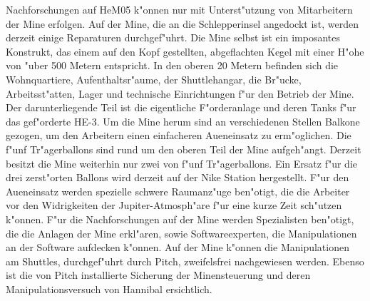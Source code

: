 Nachforschungen auf HeM05 k"onnen nur mit Unterst"utzung von Mitarbeitern der Mine erfolgen. Auf der Mine, die an die Schlepperinsel angedockt ist, werden derzeit einige Reparaturen durchgef"uhrt. Die Mine selbst ist ein imposantes Konstrukt, das einem auf den Kopf gestellten, abgeflachten Kegel mit einer H"ohe von "uber 500 Metern entspricht. In den oberen 20 Metern befinden sich die Wohnquartiere, Aufenthaltsr"aume, der Shuttlehangar, die Br"ucke, Arbeitsst"atten, Lager und technische Einrichtungen f"ur den Betrieb der Mine. Der darunterliegende Teil ist die eigentliche F"orderanlage und deren Tanks f"ur das gef"orderte HE-3. Um die Mine herum sind an verschiedenen Stellen Balkone gezogen, um den Arbeitern einen einfacheren Au\3eneinsatz zu erm"oglichen. Die f"unf Tr"agerballons sind rund um den oberen Teil der Mine aufgeh"angt. Derzeit besitzt die Mine weiterhin nur zwei von f"unf Tr"agerballons. Ein Ersatz f"ur die drei zerst"orten Ballons wird derzeit auf der Nike Station hergestellt. F"ur den Au\3eneinsatz werden spezielle schwere Raumanz"uge ben"otigt, die die Arbeiter vor den Widrigkeiten der Jupiter-Atmosph"are f"ur eine kurze Zeit sch"utzen k"onnen. F"ur die Nachforschungen auf der Mine werden Spezialisten ben"otigt, die die Anlagen der Mine erkl"aren, sowie Softwareexperten, die Manipulationen an der Software aufdecken k"onnen. Auf der Mine k"onnen die Manipulationen am Shuttles, durchgef"uhrt durch Pitch, zweifelsfrei nachgewiesen werden. Ebenso ist die von Pitch installierte Sicherung der Minensteuerung und deren Manipulationsversuch von Hannibal ersichtlich.
